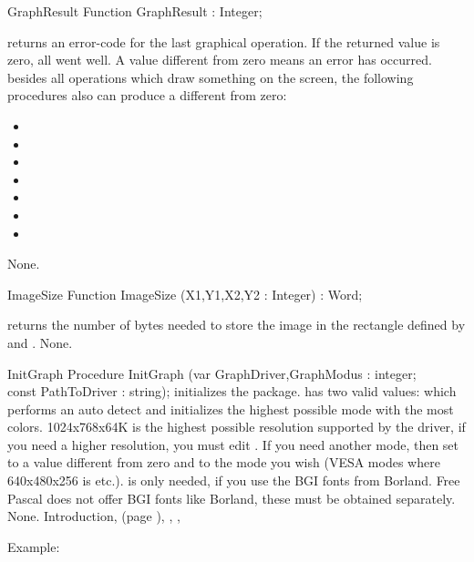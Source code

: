 \begin{function}{GraphResult}
\Declaration
Function GraphResult  : Integer;

\Description
{} returns an error-code for
the last graphical operation. If the returned value is zero, all went well.
A value different from zero means an error has occurred.
besides all operations which draw something on the screen, 
the following procedures also can produce a  different from
zero:

\begin{itemize}
\item {}
\item {}
\item {}
\item {}
\item {}
\item {}
\item {}
\end{itemize}

\Errors
None.
\SeeAlso
{}
\end{function}

\begin{function}{ImageSize}
\Declaration
Function ImageSize (X1,Y1,X2,Y2 : Integer) : Word;

\Description
{} returns
the number of bytes needed to store the image in the rectangle defined by
 and .
\Errors
None.
\SeeAlso
{}
\end{function}

\begin{procedure}{InitGraph}
\Declaration
Procedure InitGraph (var GraphDriver,GraphModus : integer;\\
const PathToDriver : string);
\Description
{} initializes the  package.
 has two valid values:  which
performs an auto detect and initializes the highest possible mode with the most
colors. 1024x768x64K is the highest possible resolution supported by the
driver, if you need a higher resolution, you must edit . 
If you need another mode, then set  to a value different
from zero
and  to the mode you wish (VESA modes where 640x480x256
is  etc.).
 is only needed, if you use the BGI fonts from
Borland. Free Pascal does not offer BGI fonts like Borland, these must be
obtained separately. 
\Errors
None.
\SeeAlso
Introduction, (page \pageref{se:Introduction}),
, , 
\end{procedure}
Example:

